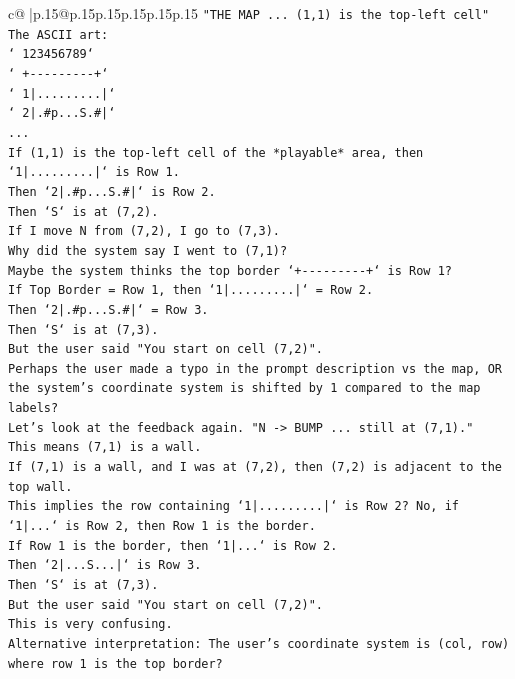 \documentclass{article}
\begin{document}
{\begin{supertabular}{c@{$\;$}|p{.15\linewidth}@{}p{.15\linewidth}p{.15\linewidth}p{.15\linewidth}p{.15\linewidth}p{.15\linewidth}}
{{{\texttt{"THE MAP ... (1,1) is the top{-}left cell"} \\
\texttt{The ASCII art:} \\
\texttt{` 123456789`} \\
\texttt{`  +{-}{-}{-}{-}{-}{-}{-}{-}{-}+`} \\
\texttt{` 1|.........|`} \\
\texttt{` 2|.\#p...S.\#|`} \\
\texttt{...} \\
\texttt{If (1,1) is the top{-}left cell of the *playable* area, then `1|.........|` is Row 1.} \\
\texttt{Then `2|.\#p...S.\#|` is Row 2.} \\
\texttt{Then `S` is at (7,2).} \\
\texttt{If I move N from (7,2), I go to (7,3).} \\
\texttt{Why did the system say I went to (7,1)?} \\
\texttt{Maybe the system thinks the top border `+{-}{-}{-}{-}{-}{-}{-}{-}{-}+` is Row 1?} \\
\texttt{If Top Border = Row 1, then `1|.........|` = Row 2.} \\
\texttt{Then `2|.\#p...S.\#|` = Row 3.} \\
\texttt{Then `S` is at (7,3).} \\
\texttt{But the user said "You start on cell (7,2)".} \\
\texttt{Perhaps the user made a typo in the prompt description vs the map, OR the system's coordinate system is shifted by 1 compared to the map labels?} \\
\texttt{Let's look at the feedback again. "N {-}> BUMP ... still at (7,1)."} \\
\texttt{This means (7,1) is a wall.} \\
\texttt{If (7,1) is a wall, and I was at (7,2), then (7,2) is adjacent to the top wall.} \\
\texttt{This implies the row containing `1|.........|` is Row 2? No, if `1|...` is Row 2, then Row 1 is the border.} \\
\texttt{If Row 1 is the border, then `1|...` is Row 2.} \\
\texttt{Then `2|...S...|` is Row 3.} \\
\texttt{Then `S` is at (7,3).} \\
\texttt{But the user said "You start on cell (7,2)".} \\
\texttt{This is very confusing.} \\
\texttt{Alternative interpretation: The user's coordinate system is (col, row) where row 1 is the top border?} \\
}}}
\end{supertabular}}
\end{document}
